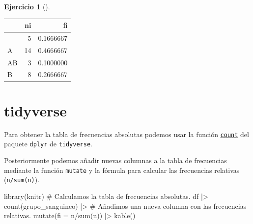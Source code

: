 \documentclass[
  spanish,
  a4paper,
]{scrreport}
\newenvironment{Shaded}{\begin{snugshade}}{\end{snugshade}}
\newcommand{\AttributeTok}[1]{\textcolor[rgb]{0.40,0.45,0.13}{#1}}
\newcommand{\CommentTok}[1]{\textcolor[rgb]{0.37,0.37,0.37}{#1}}
\newcommand{\FunctionTok}[1]{\textcolor[rgb]{0.28,0.35,0.67}{#1}}
\newcommand{\NormalTok}[1]{\textcolor[rgb]{0.00,0.23,0.31}{#1}}
\newcommand{\OtherTok}[1]{\textcolor[rgb]{0.00,0.23,0.31}{#1}}
\newcommand{\SpecialCharTok}[1]{\textcolor[rgb]{0.37,0.37,0.37}{#1}}
\theoremstyle{definition}
\newtheorem{exercise}{Ejercicio}[chapter]
\theoremstyle{remark}
\begin{document}
\begin{exercise}[]
\begin{enumerate}
\begin{tcolorbox}
\begin{Shaded}
\end{Shaded}

  \begin{longtable}[]{@{}lrr@{}}
  \toprule\noalign{}
  & ni & fi \\
  \midrule\noalign{}
  \endhead
  \bottomrule\noalign{}
  \endlastfoot
  0 & 5 & 0.1666667 \\
  A & 14 & 0.4666667 \\
  AB & 3 & 0.1000000 \\
  B & 8 & 0.2666667 \\
  \end{longtable}

  \section{tidyverse}

  Para obtener la tabla de frecuencias absolutas podemos usar la función
  \href{https://aprendeconalf.es/manual-r/06-preprocesamiento.html\#conteo-del-n\%C3\%BAmero-de-observaciones}{\texttt{count}}
  del paquete \texttt{dplyr} de \texttt{tidyverse}.

  Posteriormente podemos añadir nuevas columnas a la tabla de
  frecuencias mediante la función \texttt{mutate} y la fórmula para
  calcular las frecuencias relativas (\texttt{n/sum(n)}).

\begin{Shaded}
\begin{Highlighting}[]
\FunctionTok{library}\NormalTok{(knitr)}
\CommentTok{\# Calculamos la tabla de frecuencias absolutas.}
\NormalTok{df }\SpecialCharTok{|\textgreater{}} \FunctionTok{count}\NormalTok{(grupo\_sanguineo) }\SpecialCharTok{|\textgreater{}} 
    \CommentTok{\# Añadimos una nueva columna con las frecuencias relativas.}
    \FunctionTok{mutate}\NormalTok{(}\AttributeTok{fi =}\NormalTok{ n}\SpecialCharTok{/}\FunctionTok{sum}\NormalTok{(n)) }\SpecialCharTok{|\textgreater{}}
    \FunctionTok{kable}\NormalTok{()}
\end{Highlighting}
\end{Shaded}


\end{tcolorbox}
\end{enumerate}
\end{exercise}
\end{document}
